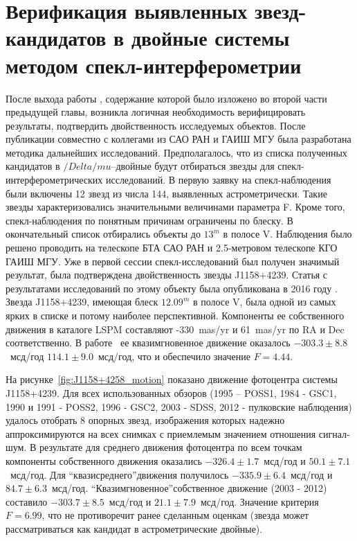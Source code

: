 \chapter{Верификация выявленных звезд-кандидатов в двойные системы методом спекл-интерферометрии} \label{ch:ch5}
После выхода работы , содержание которой было изложено во второй части предыдущей главы, возникла логичная необходимость верифицировать результаты, подтвердить двойственность исследуемых объектов. После публикации совместно с коллегами из САО РАН и ГАИШ МГУ была разработана методика дальнейших исследований. Предполагалось, что из списка полученных кандидатов в $/Delta/mu$--двойные будут отбираться звезды для спекл-интерферометрических исследований.
В первую заявку на спекл-наблюдения были включены 12 звезд из числа 144, выявленных астрометрически. Такие звезды характеризовались значительными величинами параметра F. Кроме того, спекл-наблюдения по понятным причинам ограничены по блеску. В окончательный список отбирались объекты до $13^m$ в полосе V.
 Наблюдения было решено проводить на телескопе БТА САО РАН и 2.5-метровом телескопе КГО ГАИШ МГУ. Уже в первой сессии спекл-исследований был получен  значимый результат, была подтверждена двойственность звезды J1158+4239. Статья с результатами исследований по этому объекту была опубликована в 2016 году .
Звезда J1158+4239, имеющая блеск $12.09^m$ в полосе V, была одной из самых ярких в списке и потому наиболее перспективной. Компоненты ее собственного движения в каталоге LSPM составляют -330~mas/yr и 61~mas/yr по RA и Dec соответственно. В работе~%
ее квазимгновенное движение оказалось  $-303.3\pm 8.8$~мсд/год   $114.1\pm9.0$~мсд/год, что и обеспечило значение $F = 4.44$.

На рисунке~\ref{fig:J1158+4258_motion} показано движение фотоцентра системы J1158+4239. Для всех использованных обзоров (1995 -- POSS1, 1984 - GSC1, 1990 и 1991 - POSS2, 1996 - GSC2, 2003 - SDSS, 2012 - пулковские наблюдения) удалось отобрать 8 опорных звезд, изображения которых надежно аппроксимируются на всех снимках с приемлемым значением отношения сигнал-шум. В результате для среднего движения фотоцентра по всем точкам компоненты собственного движения оказались $-326.4\pm1.7$~мсд/год    и   $50.1\pm7.1$~мсд/год. Для \textquotedblleft квазисреднего\textquotedblright движения получилось $-335.9\pm6.4$~мсд/год    и   $84.7\pm6.3$~мсд/год. \textquotedblleft Квазимгновенное\textquotedblright собственное движение (2003 - 2012) составило $-303.7\pm8.5$~мсд/год    и   $21.1\pm7.9$~мсд/год. Значение критерия $F = 6.99$, что не противоречит ранее сделанным оценкам (звезда может рассматриваться как кандидат в астрометрические двойные).

